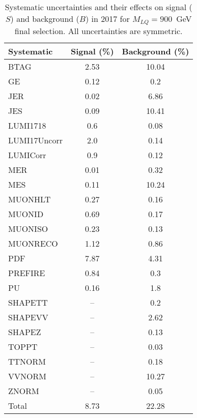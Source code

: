 \begin{table}[htbp]
\begin{center}
\caption{Systematic uncertainties and their effects on signal ($S$) and background ($B$) in 2017 for $M_{LQ}=900$~GeV final selection. All uncertainties are symmetric.}
\begin{tabular}{lcc}
\hline\hline
Systematic & Signal (\%) & Background (\%) \\ \hline 
BTAG & 2.53 & 10.04\\ 
GE & 0.12 & 0.2\\ 
JER & 0.02 & 6.86\\ 
JES & 0.09 & 10.41\\ 
LUMI1718 & 0.6 & 0.08\\ 
LUMI17Uncorr & 2.0 & 0.14\\ 
LUMICorr & 0.9 & 0.12\\ 
MER & 0.01 & 0.32\\ 
MES & 0.11 & 10.24\\ 
MUONHLT & 0.27 & 0.16\\ 
MUONID & 0.69 & 0.17\\ 
MUONISO & 0.23 & 0.13\\ 
MUONRECO & 1.12 & 0.86\\ 
PDF & 7.87 & 4.31\\ 
PREFIRE & 0.84 & 0.3\\ 
PU & 0.16 & 1.8\\ 
SHAPETT & -- & 0.2\\ 
SHAPEVV & -- & 2.62\\ 
SHAPEZ & -- & 0.13\\ 
TOPPT & -- & 0.03\\ 
TTNORM & -- & 0.18\\ 
VVNORM & -- & 10.27\\ 
ZNORM & -- & 0.05\\ 
Total & 8.73 & 22.28\\ \hline \hline
\end{tabular}
\label{tab:SysUncertainties_uujj_900}
\end{center}
\end{table}

